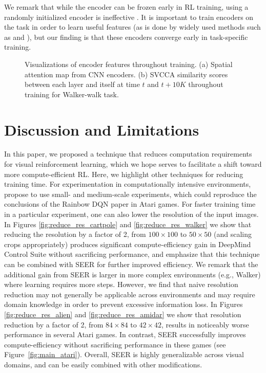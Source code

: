 \documentclass{article}
\begin{document}
We remark that while the encoder can be frozen early in RL training, using a randomly initialized encoder is ineffective \citep{stooke2021decoupling}. It is important to train encoders on the task in order to learn useful features (as is done by widely used methods such as \citet{srinivas2020curl} and \citet{laskin2020reinforcement}), but our finding is that these encoders converge early in task-specific training.

\begin{figure} [ht] \centering
{} 
\caption{Visualizations of encoder features throughout training. (a) Spatial attention map from CNN encoders. (b) SVCCA \citep{46337} similarity scores between each layer and itself at time $t$ and $t + 10K$ throughout training for Walker-walk task.} \label{fig:viz}
\end{figure}

\section{Discussion and Limitations} \label{discussion}
In this paper, we proposed a technique that reduces computation requirements for visual reinforcement learning, which we hope serves to facilitate a shift toward more compute-efficient RL. Here, we highlight other techniques for reducing training time. For experimentation in computationally intensive environments, \citet{obando2020revisiting} propose to use small- and medium-scale experiments, which could reproduce the conclusions of the Rainbow DQN paper in Atari games. For faster training time in a particular experiment, one can also lower the resolution of the input images. In Figures \ref{fig:reduce_res_cartpole} and \ref{fig:reduce_res_walker} we show that reducing the resolution by a factor of 2, from $100 \times 100$ to $50 \times 50$ (and scaling crops appropriately) produces significant compute-efficiency gain in DeepMind Control Suite without sacrificing performance, and emphasize that this technique can be combined with SEER for further improved efficiency. We remark that the additional gain from SEER is larger in more complex environments (e.g., Walker) where learning requires more steps. However, we find that naive resolution reduction may not generally be applicable across environments and may require domain knowledge in order to prevent excessive information loss. In Figures \ref{fig:reduce_res_alien} and \ref{fig:reduce_res_amidar} we show that resolution reduction by a factor of 2, from $84 \times 84$ to $42 \times 42$, results in noticeably worse performance in several Atari games. In contrast, SEER successfully improves compute-efficiency without sacrificing performance in these games (see Figure~\ref{fig:main_atari}). Overall, SEER is highly generalizable across visual domains, and can be easily combined with other modifications.
\end{document}
